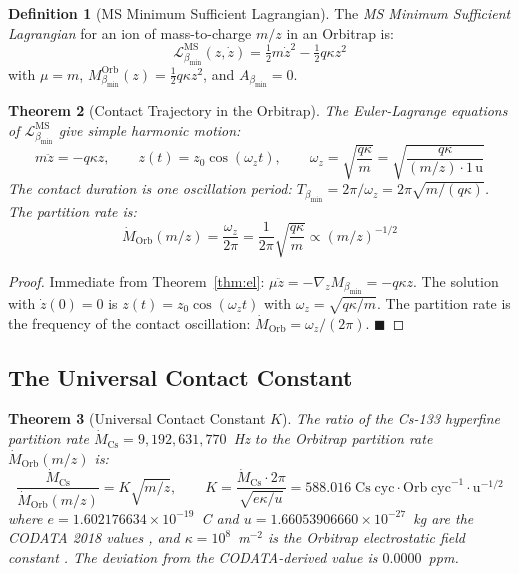 \documentclass[11pt,twocolumn,a4paper]{article}
\theoremstyle{plain}
\newtheorem{theorem}{Theorem}[section]
\theoremstyle{definition}
\newtheorem{definition}[theorem]{Definition}
\theoremstyle{remark}
\newcommand{\bmin}{\beta_{\min}}
\newcommand{\Lmin}{\mathcal{L}_{\bmin}}
\newcommand{\half}{\tfrac{1}{2}}
\renewcommand{\qed}{\hfill$\blacksquare$}
\begin{document}
\begin{definition}[MS Minimum Sufficient Lagrangian]
\label{def:ms_msl}
The \emph{MS Minimum Sufficient Lagrangian} for an ion of mass-to-charge $m/z$
in an Orbitrap is:
\[
  \Lmin^{\mathrm{MS}}(z, \dot{z}) = \half m\dot{z}^2 - \half q\kappa z^2
\]
with $\mu = m$, $M_{\bmin}^{\mathrm{Orb}}(z) = \half q\kappa z^2$, and
$A_{\bmin} = 0$.
\end{definition}

\begin{theorem}[Contact Trajectory in the Orbitrap]
\label{thm:orb_trajectory}
The Euler-Lagrange equations of $\Lmin^{\mathrm{MS}}$ give simple harmonic
motion:
\[
  m\ddot{z} = -q\kappa z, \qquad z(t) = z_0\cos(\omega_z t),\qquad
  \omega_z = \sqrt{\frac{q\kappa}{m}} = \sqrt{\frac{q\kappa}{(m/z)\cdot 1\,\mathrm{u}}}
\]
The contact duration is one oscillation period: $T_{\bmin} = 2\pi/\omega_z =
2\pi\sqrt{m/(q\kappa)}$. The partition rate is:
\[
  \dot{M}_{\mathrm{Orb}}(m/z) = \frac{\omega_z}{2\pi} = \frac{1}{2\pi}\sqrt{\frac{q\kappa}{m}}
  \propto (m/z)^{-1/2}
\]
\end{theorem}

\begin{proof}
Immediate from Theorem~\ref{thm:el}: $\mu\ddot{z} = -\nabla_z M_{\bmin} = -q\kappa z$.
The solution with $\dot{z}(0) = 0$ is $z(t) = z_0\cos(\omega_z t)$ with
$\omega_z = \sqrt{q\kappa/m}$. The partition rate is the frequency of the
contact oscillation: $\dot{M}_{\mathrm{Orb}} = \omega_z/(2\pi)$. \qed
\end{proof}

\subsection{The Universal Contact Constant}

\begin{theorem}[Universal Contact Constant $K$]
\label{thm:K}
The ratio of the Cs-133 hyperfine partition rate $\dot{M}_{\mathrm{Cs}} =
9{,}192{,}631{,}770$~Hz to the Orbitrap partition rate $\dot{M}_{\mathrm{Orb}}(m/z)$
is:
\[
  \frac{\dot{M}_{\mathrm{Cs}}}{\dot{M}_{\mathrm{Orb}}(m/z)}
  = K\sqrt{m/z},\qquad
  K = \frac{\dot{M}_{\mathrm{Cs}} \cdot 2\pi}{\sqrt{e\kappa/u}}
  = 588.016\;\mathrm{Cs\;cyc \cdot Orb\;cyc}^{-1}\cdot\mathrm{u}^{-1/2}
\]
where $e = 1.602176634\times10^{-19}$~C and $u = 1.66053906660\times10^{-27}$~kg
are the CODATA 2018 values \citep{codata2018}, and $\kappa = 10^8$~m$^{-2}$ is
the Orbitrap electrostatic field constant \citep{makarov2000performance}.
The deviation from the CODATA-derived value is $0.0000$~ppm.
\end{theorem}
\end{document}

